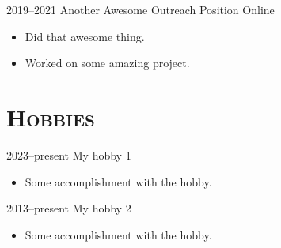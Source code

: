 \documentclass[letterpaper,11pt,twoside]{evo_cv}
\begin{document}
  \cvoutreach
    {2019--2021}
    {Another Awesome Outreach Position}
    {Online}
    {
      {
        \begin{itemize}[leftmargin=0.6cm, label={\textbullet}, before=\vspace{-1pt}, after=\vspace{3pt}]
	  \item Did that awesome thing.
	  \item Worked on some amazing project.
	\end{itemize}
      }
    }


\section{\textsc{Hobbies}}

  \cvhobby
    {2023--present}
    {My hobby 1}
    {
      {
        \begin{itemize}[leftmargin=0.6cm, label={\textbullet}, before=\vspace{-1pt}, after=\vspace{3pt}]
          \item Some accomplishment with the hobby.
        \end{itemize}
      }
    }

  \cvhobby
    {2013--present}
    {My hobby 2}
    {
      {
        \begin{itemize}[leftmargin=0.6cm, label={\textbullet}, before=\vspace{-1pt}, after=\vspace{3pt}]
          \item Some accomplishment with the hobby.
        \end{itemize}
      }
    }
\end{document}
